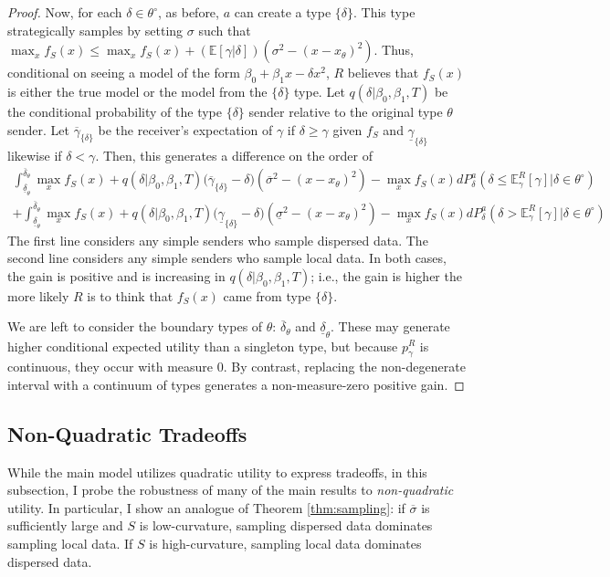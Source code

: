 \documentclass[11pt,dvipsnames]{article}
\begin{document}
\begin{appendix}
\begin{proof}
Now, for each $\delta \in \theta^\circ$, as before, $a$ can create a type $\{\delta\}$.
This type strategically samples by setting $\sigma$ such that $\max_x f_S(x) \leq \max_x f_S(x) + (\mathbb{E}[\gamma|\delta])(\sigma^2-(x-x_\theta)^2)$.
Thus, conditional on seeing a model of the form $\beta_0+\beta_1x-\delta x^2$, $R$ believes that $f_S(x)$ is either the true model or the model from the $\{\delta\}$ type.
Let $q(\delta|\beta_0,\beta_1,T)$ be the conditional probability of the type $\{\delta\}$ sender relative to the original type $\theta$ sender.
Let $\overline{\gamma}_{\{\delta\}}$ be the receiver's expectation of $\gamma$ if $\delta \geq \gamma$ given $f_S$ and $\underline{\gamma}_{\{\delta\}}$ likewise if $\delta < \gamma$.
Then, this generates a difference on the order of
\begin{align*}
\int_{\underline{\delta}_\theta}^{\overline{\delta}_\theta}
\max_x f_S(x) + q(\delta|\beta_0,\beta_1,T)\big(\overline{\gamma}_{\{\delta\}}-\delta\big)(\overline{\sigma}^2-(x-x_\theta)^2)-
\max_x f_S(x)
dP_\delta^a(\delta \leq \mathbb{E}_\gamma^R[\gamma]| \delta \in \theta^\circ)
\\
+
\int_{\underline{\delta}_\theta}^{\overline{\delta}_\theta}
\max_x f_S(x) + q(\delta|\beta_0,\beta_1,T)\big(\underline{\gamma}_{\{\delta\}}-\delta\big)(\underline{\sigma}^2-(x-x_\theta)^2)-
\max_x f_S(x)
dP_\delta^a(\delta > \mathbb{E}_\gamma^R[\gamma]| \delta \in \theta^\circ)
\end{align*}
The first line considers any simple senders who sample dispersed data.
The second line considers any simple senders who sample local data.
In both cases, the gain is positive and is increasing in $q(\delta|\beta_0,\beta_1,T)$; i.e., the gain is higher the more likely $R$ is to think that $f_S(x)$ came from type $\{\delta\}$.

We are left to consider the boundary types of $\theta$: $\overline{\delta}_\theta$ and $\underline{\delta}_\theta$.
These may generate higher conditional expected utility than a singleton type, but because $p_\gamma^R$ is continuous, they occur with measure $0$.
By contrast, replacing the non-degenerate interval with a continuum of types generates a non-measure-zero positive gain.
\end{proof}


\subsection{Non-Quadratic Tradeoffs}\label{section:general}
While the main model utilizes quadratic utility to express tradeoffs, in this subsection, I probe the robustness of many of the main results to \emph{non-quadratic} utility.
In particular, I show an analogue of Theorem \ref{thm:sampling}: if $\overline{\sigma}$ is sufficiently large and $S$ is low-curvature, sampling dispersed data dominates sampling local data.
If $S$ is high-curvature, sampling local data dominates dispersed data. 


\end{appendix}
\end{document}
